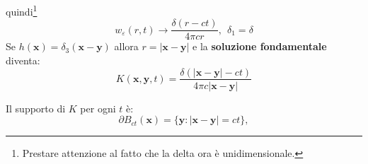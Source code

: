 \documentclass[10pt,a4paper,twoside,openright]{book}
\newcommand{\x}{\mathbf{x}}
\newcommand{\y}{\mathbf{y}}
\begin{document}
quindi\footnote{Prestare attenzione al fatto che la delta ora è unidimensionale.}
\begin{equation*}
	w_{\varepsilon }( r,t)\rightarrow \frac{\delta ( r-ct)}{4\pi cr} ,\ \ \delta _{1} =\delta 
\end{equation*}
Se $\displaystyle h(\x) =\delta _{3}(\x -\y)$ allora $\displaystyle r=| \x -\y| $ e la \textbf{soluzione fondamentale} diventa:
\begin{equation}
	\boxed{K(\x ,\y ,t) =\frac{\delta (| \x -\y| -ct)}{4\pi c| \x -\y| }}
\end{equation}
\begin{oss}
	Il supporto di $K$ per ogni $\displaystyle t$ è:
	\begin{equation}
		\partial B_{ct}(\x) =\{\y :| \x -\y| =ct\} ,
	\end{equation}


	\begin{figure}[H]
		\centering

	\begin{tikzpicture}[x=0.75pt,y=0.75pt,yscale=-1,xscale=1]


\end{tikzpicture}
\end{figure}
\end{oss}
\end{document}
